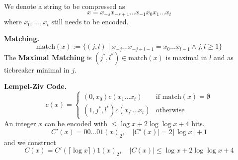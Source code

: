 We denote a string to be compressed as 
\[x = x_{-s}x_{-s+1}...x_{-1}x_0x_1...x_t\]
where \(x_0, ..., x_t\) still needs to be encoded.

\textbf{Matching.}
\[\text{match}(x) := \{(j, l) \mid x_{-j}...x_{-j+l-1} = x_{0}...x_{l-1} \land j, l \geq 1\}\]
The \textbf{Maximal Matching} is \((j^*, l^*) \in \text{match}(x)\) is maximal in \(l\) and as tiebreaker minimal in \(j\).

\textbf{Lempel-Ziv Code.}
\[c(x) = \begin{cases}
    (0, x_0)c(x_1...x_t) & \text{if match}(x) = \emptyset\\
    (1, j^*, l^*)c(x_{l^*}...x_t) & \text{otherwise}
\end{cases}\]
An integer \(x\) can be encoded with \(\leq \log x + 2 \log \log x + 4\) bits.
\[C'(x) = 00...01(x)_2, \quad |C'(x)| = 2 \lceil \log x \rceil + 1\]
and we construct
\[C(x) = C'(\lceil \log x\rceil)1(x)_2, \quad |C(x)| \leq \log x + 2 \log \log x + 4\]
